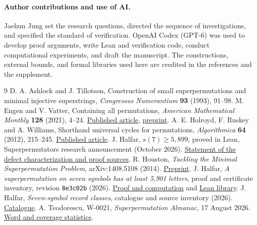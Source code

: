 \documentclass[11pt]{article}
\begin{document}
\paragraph{Author contributions and use of AI.}
Jaehun Jung set the research questions, directed the sequence of investigations, and specified the standard of verification. OpenAI Codex (GPT-6) was used to develop proof arguments, write Lean and verification code, conduct computational experiments, and draft the manuscript. The constructions, external bounds, and formal libraries used here are credited in the references and the supplement.

\begin{thebibliography}{9}
 D. A. Ashlock and J. Tillotson, Construction of small superpermutations and minimal injective superstrings, \emph{Congressus Numerantium} \textbf{93} (1993), 91--98.
 M. Engen and V. Vatter, Containing all permutations, \emph{American Mathematical Monthly} \textbf{128} (2021), 4--24. \href{https://doi.org/10.1080/00029890.2021.1835384}{Published article}, \href{https://arxiv.org/abs/1810.08252}{preprint}.
 A. E. Holroyd, F. Ruskey and A. Williams, Shorthand universal cycles for permutations, \emph{Algorithmica} \textbf{64} (2012), 215--245. \href{https://doi.org/10.1007/s00453-011-9544-z}{Published article}.
 J. Halfar, $s(7)\ge5{,}899$, proved in Lean, Superpermutators research announcement (October 2026). \href{https://groups.google.com/g/superpermutators/c/dmBTmhy0a1A}{Statement of the defect characterization and proof sources}.
 R. Houston, \emph{Tackling the Minimal Superpermutation Problem}, arXiv:1408.5108 (2014). \href{https://arxiv.org/abs/1408.5108}{Preprint}.
 J. Halfar, \emph{A superpermutation on seven symbols has at least 5,901 letters}, proof and certificate inventory, revision \texttt{8e3c02b} (2026). \href{https://github.com/jhalfar/superpermutations/tree/8e3c02b5234b49a1422751f86f9e472706082374/proofs/n7_5901}{Proof and computation} and \href{https://github.com/jhalfar/superpermutation-almanac-lean/tree/a09f9ef4ebb74ae1297f17c5fad38296695f2959}{Lean library}.
 J. Halfar, \emph{Seven-symbol record classes}, catalogue and source inventory (2026). \href{https://github.com/jhalfar/superpermutations/tree/8e3c02b5234b49a1422751f86f9e472706082374/ties}{Catalogue}.
 A. Teodorescu, W-0021, \emph{Superpermutation Almanac}, 17 August 2026. \href{https://superpermutations.com/w/W-0021}{Word and coverage statistics}.
\end{thebibliography}
\end{document}
